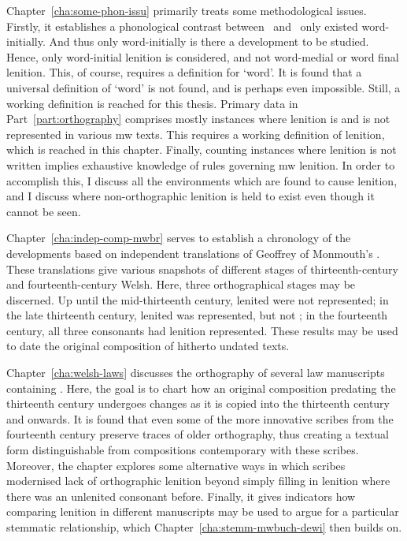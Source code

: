 Chapter~\ref{cha:some-phon-issu} primarily treats some methodological issues. Firstly, it establishes a phonological contrast between \lT\ and \xD\ only existed word-initially. And thus only word-initially is there a development to be studied. Hence, only word-initial lenition is considered, and not word-medial or word final lenition. This, of course, requires a definition for `word'. It is found that a universal definition of `word' is not found, and is perhaps even impossible. Still, a working definition is reached for this thesis. Primary data in Part~\ref{part:orthography} comprises mostly instances where lenition is and is not represented in various \gls{mw} texts. This requires a working definition of lenition, which is reached in this chapter. Finally, counting instances where lenition is not written implies exhaustive knowledge of rules governing \gls{mw} lenition. In order to accomplish this, I discuss all the environments which are found to cause lenition, and I discuss where non-orthographic lenition is held to exist even though it cannot be seen.

Chapter~\ref{cha:indep-comp-mwbr} serves to establish a chronology of the developments based on independent translations of Geoffrey of Monmouth's . These translations give various snapshots of different stages of thirteenth-century and fourteenth-century Welsh. Here, three orthographical stages may be discerned. Up until the mid-thirteenth century, lenited  were not represented; in the late thirteenth century, lenited  was represented, but not ; in the fourteenth century, all three consonants had lenition represented. These results may be used to date the original composition of hitherto undated texts.


Chapter~\ref{cha:welsh-laws} discusses the orthography of several law manuscripts containing . Here, the goal is to chart how an original composition predating the thirteenth century undergoes changes as it is copied into the thirteenth century and onwards. It is found that even some of the more innovative scribes from the fourteenth century preserve traces of older orthography, thus creating a textual form distinguishable from compositions contemporary with these scribes. Moreover, the chapter explores some alternative ways in which scribes modernised lack of orthographic lenition beyond simply filling in lenition where there was an unlenited consonant before. Finally, it gives indicators how comparing lenition in different manuscripts may be used to argue for a particular stemmatic relationship, which Chapter~\ref{cha:stemm-mwbuch-dewi} then builds on.

